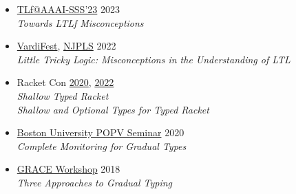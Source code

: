 \documentclass[11pt]{article}
\begin{document}
\begin{itemize}
  \item
    \href{https://ltlf-symposium.github.io/}{TLf@AAAI-SSS'23} \hfill 2023 \\
    \emph{Towards LTLf Misconceptions}
  \item
    \href{https://vardifest.github.io}{VardiFest}, \href{http://njpls.org/oct22.html}{NJPLS} \hfill 2022\\
    \emph{Little Tricky Logic: Misconceptions in the Understanding of LTL}
  \item
    Racket Con \hfill \href{https://con.racket-lang.org/2020}{2020}, \href{https://con.racket-lang.org/2022}{2022}\\
    \emph{Shallow Typed Racket} \\
    \emph{Shallow and Optional Types for Typed Racket}
  \item
    \href{https://www.bu.edu/cs/research/popv/seminar/}{Boston University POPV Seminar} \hfill {2020}\\
    \emph{Complete Monitoring for Gradual Types}
  \item
    \href{https://2018.splashcon.org/track/grace-2018-papers}{GRACE Workshop} \hfill 2018\\
    \emph{Three Approaches to Gradual Typing}
\end{itemize}
\end{document}

